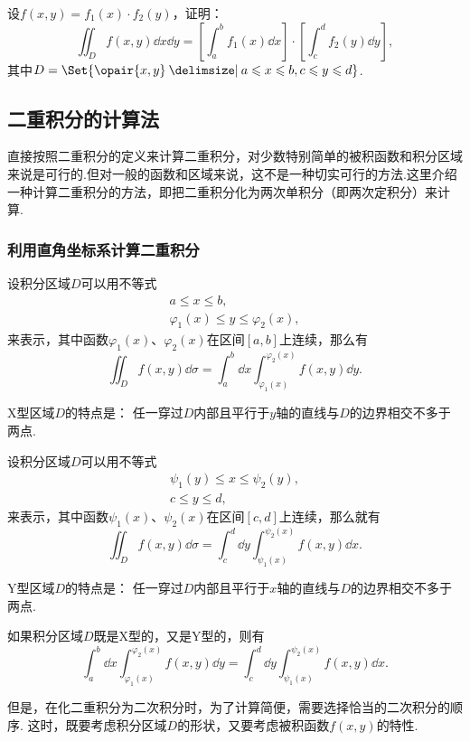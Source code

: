 \begin{example}
设\(f(x,y) = f_1(x) \cdot f_2(y)\)，证明：\[
\iint_D f(x,y) \dd{x} \dd{y}
= \left[ \int_a^b f_1(x) \dd{x} \right] \cdot \left[ \int_c^d f_2(y) \dd{y} \right],
\]其中\(D = \Set{\opair{x,y} \given a \leqslant x \leqslant b, c \leqslant y \leqslant d}\).
\end{example}

\subsection{二重积分的计算法}
直接按照二重积分的定义来计算二重积分，对少数特别简单的被积函数和积分区域来说是可行的.但对一般的函数和区域来说，这不是一种切实可行的方法.这里介绍一种计算二重积分的方法，即把二重积分化为两次单积分（即两次定积分）来计算.

\subsubsection{利用直角坐标系计算二重积分}
\begin{theorem}[X型区域]
设积分区域\(D\)可以用不等式\begin{gather*}
a \leqslant x \leqslant b, \\
\varphi_1(x) \leqslant y \leqslant \varphi_2(x),
\end{gather*}来表示，其中函数\(\varphi_1(x)\)、\(\varphi_2(x)\)在区间\([a,b]\)上连续，那么有\[
\iint_D f(x,y) \dd{\sigma}
=\int_a^b \dd{x} \int_{\varphi_1(x)}^{\varphi_2(x)} f(x,y) \dd{y}.
\]
\end{theorem}
X型区域\(D\)的特点是：
任一穿过\(D\)内部且平行于\(y\)轴的直线与\(D\)的边界相交不多于两点.

\begin{theorem}[Y型区域]
设积分区域\(D\)可以用不等式\begin{gather*}
\psi_1(y) \leqslant x \leqslant \psi_2(y), \\
c \leqslant y \leqslant d,
\end{gather*}来表示，其中函数\(\psi_1(x)\)、\(\psi_2(x)\)在区间\([c,d]\)上连续，那么就有\[
\iint_D f(x,y) \dd{\sigma}
=\int_c^d \dd{y} \int_{\psi_1(x)}^{\psi_2(x)} f(x,y) \dd{x}.
\]
\end{theorem}
Y型区域\(D\)的特点是：
任一穿过\(D\)内部且平行于\(x\)轴的直线与\(D\)的边界相交不多于两点.

\begin{corollary}
如果积分区域\(D\)既是X型的，又是Y型的，则有\[
\int_a^b \dd{x}
 \int_{\varphi_1(x)}^{\varphi_2(x)} f(x,y) \dd{y}
=\int_c^d \dd{y}
 \int_{\psi_1(x)}^{\psi_2(x)} f(x,y) \dd{x}.
\]

但是，在化二重积分为二次积分时，为了计算简便，需要选择恰当的二次积分的顺序.
这时，既要考虑积分区域\(D\)的形状，又要考虑被积函数\(f(x,y)\)的特性.
\end{corollary}

